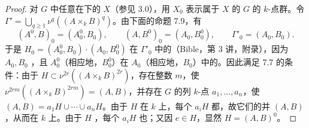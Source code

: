\begin{proof}
对 $G$ 中任意在下的 $X$（参见 3.0），用 $X_0$ 表示属于 $X$ 的 $G$ 的 $k$-点群。令 $\Gamma'=\bigcup_{q\geq1}\nu^q((A\times_k B)^q)$。由下面的命题 7.9，有
\[
(A^0,B)_0=(A^0_0,B_0),\qquad
(A,B^0)_0=(A_0,B^0_0),\qquad
\Gamma'_0=(A_0,B_0).
\]
于是 $H_0=(A^0_0,B_0)\cdot(A_0,B^0_0)$ 在 $\Gamma'_0$ 中的（Bible，第 3 讲，附录），因为 $A_0,B_0$ ，且 $A^0_0$（相应地，$B^0_0$）在 $A_0$（相应地，$B_0$）中的。因此满足 7.7 的条件：由于 $H\subset\nu^{2r}((A\times_k B)^{2r})$，存在整数 $m$，使 $\nu^{2rm}((A\times_k B)^{2rm})=(A,B)$，并存在 $G$ 的列 $k$-点 $a_1,\ldots,a_n$，使 $(A,B)=a_1H\cup\cdots\cup a_nH$。由于 $H$ 在 $k$ 上，每个 $a_iH$ 都，故它们的并 $(A,B)$ ，从而在 $k$ 上。由于 $H$ ，每个 $a_iH$ 也；又因 $e\in H$，显然 $H=(A,B)^0$。
\end{proof}

